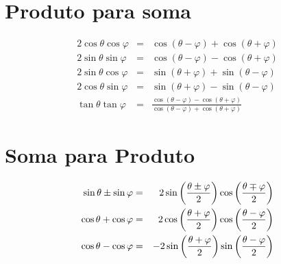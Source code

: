\section{Produto para soma}
\begin{eqnarray}
2\cos \theta \cos \varphi &=& {{\cos(\theta - \varphi) + \cos(\theta + \varphi)}}\\
2\sin \theta \sin \varphi &=& {{\cos(\theta - \varphi) - \cos(\theta + \varphi)} }\\
2\sin \theta \cos \varphi &=& {{\sin(\theta + \varphi) + \sin(\theta - \varphi)} }\\
2\cos \theta \sin \varphi &=& {{\sin(\theta + \varphi) - \sin(\theta - \varphi)} }\\
\tan \theta \tan \varphi &=&\frac{\cos(\theta-\varphi)-\cos(\theta+\varphi)}{\cos(\theta-\varphi)+\cos(\theta+\varphi)}
\end{eqnarray}


\section{Soma para Produto}
\begin{eqnarray}
\sin \theta \pm \sin \varphi &=& 2 \sin\left( \frac{\theta \pm \varphi}{2} \right) \cos\left( \frac{\theta \mp \varphi}{2} \right)\\
\cos \theta + \cos \varphi &=& 2 \cos\left( \frac{\theta + \varphi} {2} \right) \cos\left( \frac{\theta - \varphi}{2} \right)\\
\cos \theta - \cos \varphi &=& -2\sin\left( {\theta + \varphi \over 2}\right) \sin\left({\theta - \varphi \over 2}\right)\\
\end{eqnarray}

